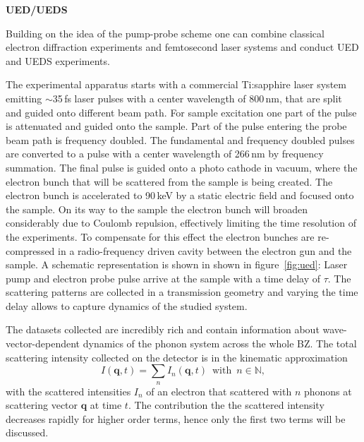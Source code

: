 \textbf{UED/UEDS}

Building on the idea of the pump-probe scheme one can combine classical electron diffraction experiments and femtosecond laser systems and conduct \ac{UED} and \ac{UEDS} experiments.

The experimental apparatus starts with a commercial Ti:sapphire laser system emitting $\sim$35\,fs laser pulses with a center wavelength of 800\,nm, that are split and guided onto different beam path.
For sample excitation one part of the pulse is attenuated and guided onto the sample.
Part of the pulse entering the probe beam path is frequency doubled. The fundamental and frequency doubled pulses are converted to a pulse with a center wavelength of 266\,nm by frequency summation.
The final pulse is guided onto a photo cathode in vacuum, where the electron bunch that will be scattered from the sample is being created.
The electron bunch is accelerated to 90\,keV by a static electric field and focused onto the sample.
On its way to the sample the electron bunch will broaden considerably due to Coulomb repulsion, effectively limiting the time resolution of the experiments.
To compensate for this effect the electron bunches are re-compressed in a radio-frequency driven cavity between the electron gun and the sample.
A schematic representation is shown in shown in figure~\ref{fig:ued}:
Laser pump and electron probe pulse arrive at the sample with a time delay of $\tau$.
The scattering patterns are collected in a transmission geometry and varying the time delay allows to capture dynamics of the studied system.

The datasets collected are incredibly rich and contain information about wave-vector-dependent dynamics of the phonon system across the whole \ac{BZ}.
The total scattering intensity collected on the detector is in the kinematic approximation
\begin{equation} I(\mathbf{q},t) = \sum_n I_n(\mathbf{q},t)\enspace\text{with}\enspace n \in\mathbb{N},\label{eq:I}\end{equation}
with the scattered intensities $I_n$ of an electron that scattered with $n$ phonons at scattering vector $\mathbf{q}$ at time $t$.
The contribution the the scattered intensity decreases rapidly for higher order terms, hence only the first two terms will be discussed.

